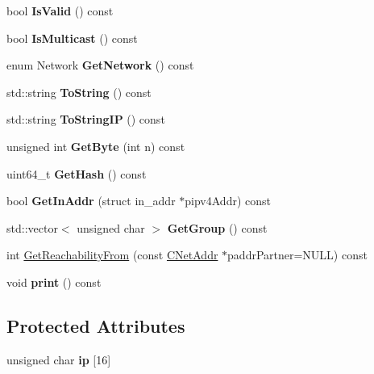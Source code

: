 \begin{DoxyCompactItemize}
\item 
\mbox{\label{class_c_net_addr_a6fe20b8da9701ca5dc2af078e2e8ac25}} 
bool {\bfseries Is\+Valid} () const
\item 
\mbox{\label{class_c_net_addr_aabd54a329f70953f7895b56bcd000473}} 
bool {\bfseries Is\+Multicast} () const
\item 
\mbox{\label{class_c_net_addr_ad0162f2629f552a65acf934e1629c1db}} 
enum Network {\bfseries Get\+Network} () const
\item 
\mbox{\label{class_c_net_addr_a474ea3874554fe3b79f607fdef97c243}} 
std\+::string {\bfseries To\+String} () const
\item 
\mbox{\label{class_c_net_addr_a0c8d9b5ed3824546ff4dccca3b28b073}} 
std\+::string {\bfseries To\+String\+IP} () const
\item 
\mbox{\label{class_c_net_addr_acfd51ebf2030b01fa5ac133176512475}} 
unsigned int {\bfseries Get\+Byte} (int n) const
\item 
\mbox{\label{class_c_net_addr_a8fae7d32e83e9fbb9ce0216f896133c9}} 
uint64\+\_\+t {\bfseries Get\+Hash} () const
\item 
\mbox{\label{class_c_net_addr_a4f73432c55d4acb6b9e4c54833eefea6}} 
bool {\bfseries Get\+In\+Addr} (struct in\+\_\+addr $\ast$pipv4\+Addr) const
\item 
\mbox{\label{class_c_net_addr_a6f8211515f809f6972ce327433d41458}} 
std\+::vector$<$ unsigned char $>$ {\bfseries Get\+Group} () const
\item 
int \mbox{\hyperlink{class_c_net_addr_aa68c7d6112b22759dcd280ddad30808f}{Get\+Reachability\+From}} (const \mbox{\hyperlink{class_c_net_addr}{C\+Net\+Addr}} $\ast$paddr\+Partner=N\+U\+LL) const
\item 
\mbox{\label{class_c_net_addr_acc3d64862502629192eb56136d59e8d4}} 
void {\bfseries print} () const
\end{DoxyCompactItemize}
\subsection*{Protected Attributes}
\begin{DoxyCompactItemize}
\item 
\mbox{\label{class_c_net_addr_acff7ce68f33f8dfbfe6d79d80928d417}} 
unsigned char {\bfseries ip} \mbox{[}16\mbox{]}
\end{DoxyCompactItemize}
